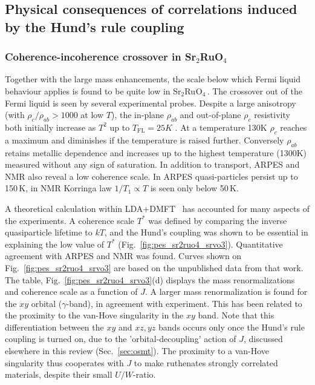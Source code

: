 \documentclass[]{ar2e-changed}%
\def\SROtwo{Sr$_{2}$Ru$_{}$O$_{4}$\,}
\begin{document}
\subsection{Physical consequences of correlations induced by the Hund's rule coupling}
\label{sec:ruthenates_physics}

\subsubsection{Coherence-incoherence crossover in Sr$_2$RuO$_4$}

Together with the large mass enhancements, the scale below which Fermi liquid behaviour 
applies is found to be quite low in \SROtwo. 
%
The crossover out of the Fermi liquid is seen by
several experimental probes.  Despite a large anisotropy (with
$\rho_c/\rho_{ab}>1000$ at low $T$), the in-plane $\rho_{ab}$ and
out-of-plane $\rho_c$ resistivity both initially increase as $T^2$ up
to $T_\mathrm{FL}=25K$ \cite{hussey_prb_1998}. 
At a temperature 130K $\rho_c$ reaches a maximum and diminishes if the
temperature is raised further. Conversely $\rho_{ab}$ retains 
metallic dependence and increases up to the highest temperature (1300K)
measured \cite{tyler_prb_1998} without any sign of saturation.  In
addition to transport, ARPES \cite{wang_prl_2004, kidd_prl_2005} and
NMR \cite{imai_prl_1998} also reveal a low coherence scale. In ARPES
quasi-particles persist up to 150\,K, in NMR Korringa law
$1/T_1 \propto T$ is seen only below 50\,K. 

A theoretical calculation within LDA+DMFT~\cite{mravlje11} has
accounted for many aspects of the experiments. 
%
A coherence scale $T^*$ was defined by comparing the inverse quasiparticle lifetime to 
$kT$, and the Hund's coupling was shown to be essential in explaining the low value of $T^*$ 
(Fig.~\ref{fig:pes_sr2ruo4_srvo3}). 
%
Quantitative agreement with ARPES and NMR was found. Curves shown on
Fig.~\ref{fig:pes_sr2ruo4_srvo3} are based on the unpublished data
from that work.  The table, Fig.~\ref{fig:pes_sr2ruo4_srvo3}(d)
displays the mass renormalizations and coherence scale as a function of
$J$.  A larger mass renormalization is found for the $xy$ orbital ($\gamma$-band), 
in agreement with experiment. This has been related to
the proximity to the van-Hove singularity in the $xy$ band. 
Note that this differentiation between the $xy$ and $xz,yz$ bands occurs only once the
Hund's rule coupling is turned on, due to the 'orbital-decoupling'
action of $J$, discussed elsewhere in this review (Sec.~\ref{sec:osmt}). The proximity to a
van-Hove singularity thus cooperates with $J$ to make ruthenates strongly
correlated materials, despite their small $U/W$-ratio.
\end{document}
